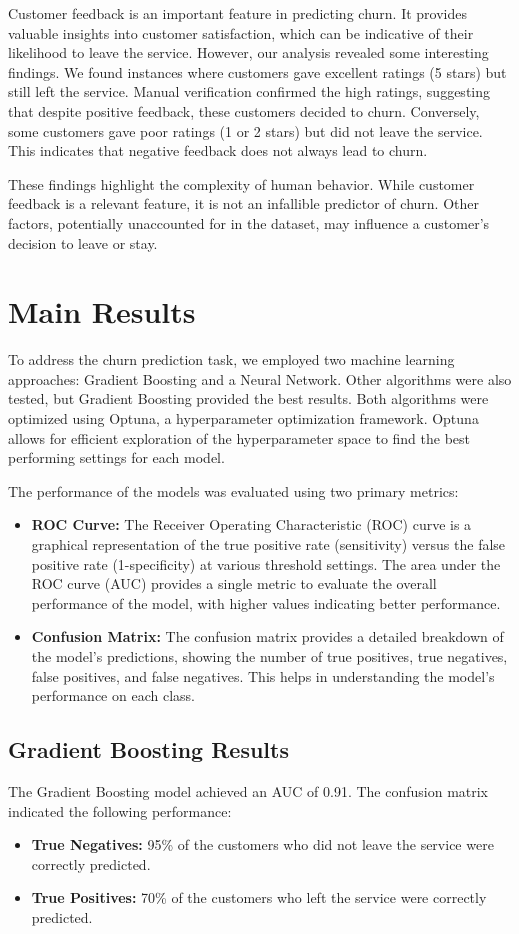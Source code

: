 \documentclass[12pt]{article}
\begin{document}
Customer feedback is an important feature in predicting churn. It provides valuable insights into customer satisfaction, which can be indicative of their likelihood to leave the service. However, our analysis revealed some interesting findings. We found instances where customers gave excellent ratings (5 stars) but still left the service. Manual verification confirmed the high ratings, suggesting that despite positive feedback, these customers decided to churn. Conversely, some customers gave poor ratings (1 or 2 stars) but did not leave the service. This indicates that negative feedback does not always lead to churn.

These findings highlight the complexity of human behavior. While customer feedback is a relevant feature, it is not an infallible predictor of churn. Other factors, potentially unaccounted for in the dataset, may influence a customer's decision to leave or stay. 

\section{Main Results}
To address the churn prediction task, we employed two machine learning approaches: Gradient Boosting and a Neural Network. Other algorithms were also tested, but Gradient Boosting provided the best results. Both algorithms were optimized using Optuna, a hyperparameter optimization framework. Optuna allows for efficient exploration of the hyperparameter space to find the best performing settings for each model.

The performance of the models was evaluated using two primary metrics:
\begin{itemize}
    \item \textbf{ROC Curve:} The Receiver Operating Characteristic (ROC) curve is a graphical representation of the true positive rate (sensitivity) versus the false positive rate (1-specificity) at various threshold settings. The area under the ROC curve (AUC) provides a single metric to evaluate the overall performance of the model, with higher values indicating better performance.
    \item \textbf{Confusion Matrix:} The confusion matrix provides a detailed breakdown of the model's predictions, showing the number of true positives, true negatives, false positives, and false negatives. This helps in understanding the model's performance on each class.
\end{itemize}

\subsection{Gradient Boosting Results}
The Gradient Boosting model achieved an AUC of 0.91. The confusion matrix indicated the following performance:
\begin{itemize}
    \item \textbf{True Negatives:} 95\% of the customers who did not leave the service were correctly predicted.
    \item \textbf{True Positives:} 70\% of the customers who left the service were correctly predicted.
\end{itemize}
\end{document}
